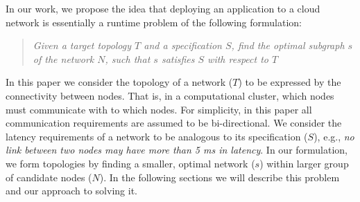 In our work, we propose the idea that deploying an application to a cloud network is essentially a runtime problem of the following formulation:

\begin{quote}
\textit{Given a target topology $T$ and a specification $S$, find the optimal subgraph $s$ of the network $N$, such that $s$ satisfies $S$ with respect to $T$}
\end{quote}

In this paper we consider the topology of a network ($T$) to be expressed by the connectivity between nodes. That is, in a computational cluster, which nodes must communicate with to which nodes. For simplicity, in this paper all communication requirements are assumed to be bi-directional. We consider the latency requirements of a network to be analogous to its specification ($S$), e.g., \textit{no link between two nodes may have more than 5 ms in latency}. In our formulation, we form topologies by finding a smaller, optimal network ($s$) within larger group of candidate nodes ($N$). In the following sections we will describe this problem and our approach to solving it. 
